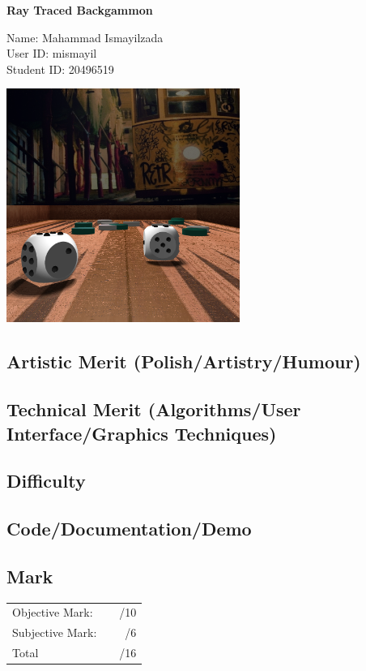 \documentclass{article}
\newcommand\projecttitle{Ray Traced Backgammon}
\newcommand\myname{Mahammad Ismayilzada}
\newcommand\myuserid{mismayil}
\newcommand\mystudentid{20496519}
\begin{document}
\begin{minipage}[t]{3in}
{\huge \bf
	\projecttitle
}

\medskip
Name: \myname \\
User ID: \myuserid \\
Student ID: \mystudentid
\end{minipage}
\hfill
\begin{minipage}[t]{3in}
\vspace{0pt}
\includegraphics[width=3in]{backgammon.png}   %
\end{minipage}


\subsection*{Artistic Merit (Polish/Artistry/Humour)}
\vfill
\subsection*{Technical Merit (Algorithms/User Interface/Graphics Techniques)}
\vfill
\subsection*{Difficulty}
\vfill
\subsection*{Code/Documentation/Demo}
\vfill
\subsection*{Mark}
\begin{center}
\begin{tabular}{lr}
Objective Mark: &~~/10\\
Subjective Mark: &~~/6\\
\hline
Total &~~/16
\end{tabular}
\end{center}
\end{document}
